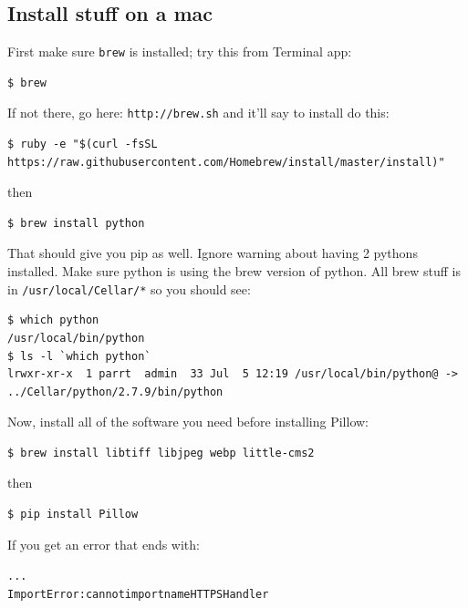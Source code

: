 \subsection{Install stuff on a mac}

First make sure {\tt brew} is installed; try this from Terminal app:

\begin{lstlisting}[style=BashInputStyle]
$ brew
\end{lstlisting}

\noindent If not there, go here: {\tt http://brew.sh} and it'll say to install do this:

\begin{lstlisting}[style=BashInputStyle]
$ ruby -e "$(curl -fsSL https://raw.githubusercontent.com/Homebrew/install/master/install)"
\end{lstlisting}

\noindent then

\begin{lstlisting}[style=BashInputStyle]
$ brew install python
\end{lstlisting}

\noindent That should give you pip as well.  Ignore warning about having 2 pythons installed.  Make sure python is using the brew version of python. All brew stuff is in {\tt /usr/local/Cellar/*} so you should see:

\begin{lstlisting}[style=BashInputStyle]
$ which python
/usr/local/bin/python
$ ls -l `which python`
lrwxr-xr-x  1 parrt  admin  33 Jul  5 12:19 /usr/local/bin/python@ -> ../Cellar/python/2.7.9/bin/python
\end{lstlisting}

\noindent Now, install all of the software you need before installing Pillow:

\begin{lstlisting}[style=BashInputStyle]
$ brew install libtiff libjpeg webp little-cms2
\end{lstlisting}

\noindent then

\begin{lstlisting}[style=BashInputStyle]
$ pip install Pillow
\end{lstlisting}

\noindent If you get an error that ends with:

\begin{alltt}
    ...
    ImportError: cannot import name HTTPSHandler
\end{alltt}

